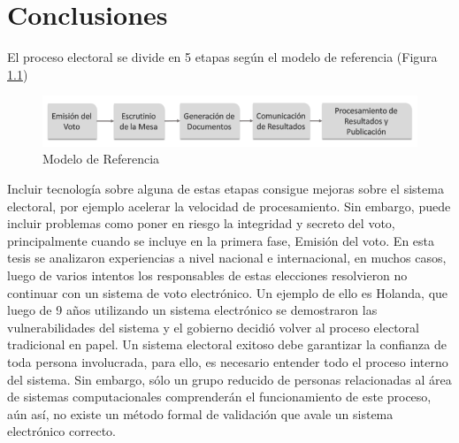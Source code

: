 \chapter{Conclusiones}
\label{conclusiones}

El proceso electoral se divide en 5 etapas según el modelo de referencia \cite{conicet} (Figura \ref{graf:modeloReferencia})
\begin{figure}[h!]
    \begin{center}
        \includegraphics[width=\textwidth]{img/modeloReferencia.png}
    \end{center}
  \caption{Modelo de Referencia}
  \label{graf:modeloReferencia}
\end{figure}
\newline

Incluir tecnología sobre alguna de estas etapas consigue mejoras sobre el sistema electoral, por ejemplo acelerar la velocidad de procesamiento. Sin embargo, puede incluir problemas como  poner en riesgo la integridad y secreto del voto, principalmente cuando se incluye en la primera fase, Emisión del voto. En esta tesis se analizaron experiencias a nivel nacional e internacional, en muchos casos, luego de varios intentos los responsables de estas elecciones resolvieron no continuar con un sistema de voto electrónico. Un ejemplo de ello es Holanda, que luego de 9 años utilizando un sistema electrónico se demostraron las vulnerabilidades del sistema y el gobierno decidió volver al proceso electoral tradicional en papel. Un sistema electoral exitoso debe garantizar la confianza de toda persona involucrada, para ello, es necesario entender todo el proceso interno del sistema. Sin embargo, sólo un grupo reducido de personas relacionadas al área de sistemas computacionales comprenderán el funcionamiento de este proceso, aún así, no existe un método formal de validación que avale un sistema electrónico correcto. 

